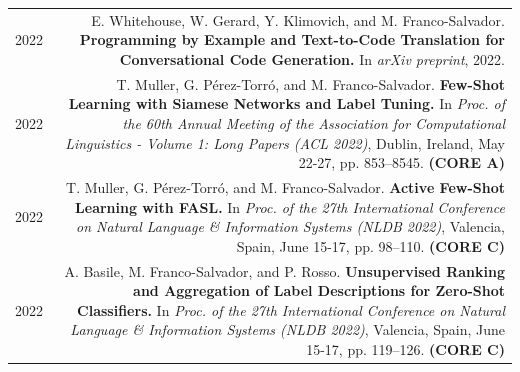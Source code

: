 \documentclass[10pt]{article}
\begin{document}
\begin{tabular}{L!{\VRule}R}
	2022 & E. Whitehouse, W. Gerard, Y. Klimovich, and M. Franco-Salvador. \textbf{Programming by Example and Text-to-Code Translation for Conversational Code Generation.} In \emph{arXiv preprint}, 2022. \vspace{5pt}\\
	2022 & T. Muller, G. P{\'e}rez-Torr{\'o}, and M. Franco-Salvador. \textbf{Few-Shot Learning with Siamese Networks and Label Tuning.} In \emph{Proc. of the 60th Annual Meeting of the Association for Computational Linguistics - Volume 1: Long Papers (ACL 2022)}, Dublin, Ireland, May 22-27, pp. 853--8545. \textbf{(CORE A)} \vspace{5pt}\\
	2022 & T. Muller, G. P{\'e}rez-Torr{\'o}, and M. Franco-Salvador. \textbf{Active Few-Shot Learning with FASL.}
	In \emph{Proc. of the 27th International Conference on Natural Language \& Information Systems (NLDB 2022)}, Valencia, Spain, June 15-17, pp.  98--110. \textbf{(CORE C)} \vspace{5pt}\\
	2022 & A. Basile, M. Franco-Salvador, and P. Rosso. \textbf{Unsupervised Ranking and Aggregation of Label Descriptions for Zero-Shot Classifiers.}
	In \emph{Proc. of the 27th International Conference on Natural Language \& Information Systems (NLDB 2022)}, Valencia, Spain, June 15-17, pp. 119--126. \textbf{(CORE C)} \vspace{5pt}\\
\end{tabular}
\end{document}

